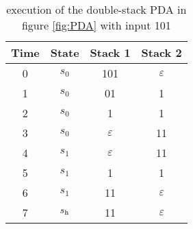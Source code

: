 \begin{table}[t]
	\centering
	\begin{tabular}{|c| c c c |}
		\hline 
		Time & State & Stack 1 & Stack 2 \\
		\hline
		0 & $s_0$ & 101 & $\varepsilon$ \\
		1 & $s_0$ & 01 & 1 \\
		2 & $s_0$ & 1 & 1 \\
		3 & $s_0$ & $\varepsilon$ & 11 \\
		4 & $s_1$ & $\varepsilon$ & 11 \\
		5 & $s_1$ & 1 & 1 \\
		6 & $s_1$ & 11 & $\varepsilon$ \\
		7 & $s_{\mathrm{h}}$ & 11 & $\varepsilon$ \\
		\hline
	\end{tabular}
	\caption{execution of the double-stack PDA in figure \ref{fig:PDA} with input 101}
	\label{tab:execution}
\end{table}